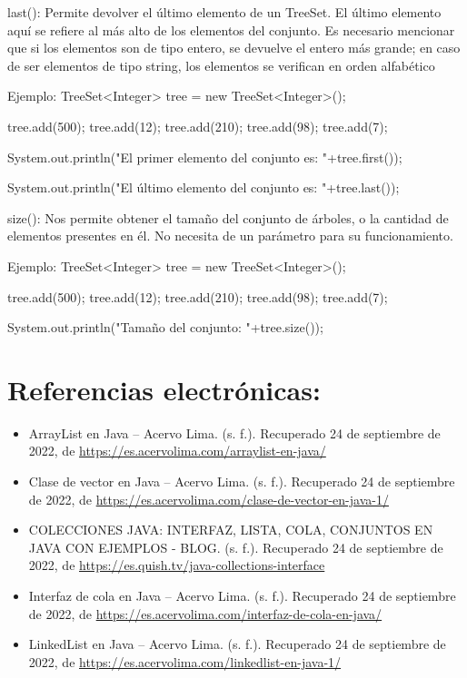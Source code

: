 \documentclass[12pt, letterpaper]{article} %
\begin{document}
last():
Permite devolver el último elemento de un TreeSet. El último elemento aquí se refiere al más alto de los elementos del conjunto. Es necesario mencionar que si los elementos son de tipo entero, se devuelve el entero más grande; en caso de ser elementos de tipo string, los elementos se verifican en orden alfabético

Ejemplo:
TreeSet<Integer> tree = new TreeSet<Integer>();

tree.add(500);
tree.add(12);
tree.add(210);
tree.add(98);
tree.add(7);

System.out.println("El primer elemento del conjunto es: "+tree.first());

System.out.println("El último elemento del conjunto es: "+tree.last());


size():
Nos permite obtener el tamaño del conjunto de árboles, o la cantidad de elementos presentes en él. No necesita de un parámetro para su funcionamiento.

Ejemplo:
TreeSet<Integer> tree = new TreeSet<Integer>();

tree.add(500);
tree.add(12);
tree.add(210);
tree.add(98);
tree.add(7);

System.out.println("Tamaño del conjunto: "+tree.size());


\section*{Referencias electrónicas:}
\begin{itemize}
    \item ArrayList en Java – Acervo Lima. (s. f.). Recuperado 24 de septiembre de 2022, de \href{https://bit.ly/3fB4HAN}{https://es.acervolima.com/arraylist-en-java/}
    
    \item Clase de vector en Java – Acervo Lima. (s. f.). Recuperado 24 de septiembre de 2022, de \href{https://es.acervolima.com/clase-de-vector-en-java-1/}{https://es.acervolima.com/clase-de-vector-en-java-1/}
    
    \item COLECCIONES JAVA: INTERFAZ, LISTA, COLA, CONJUNTOS EN JAVA CON EJEMPLOS - BLOG. (s. f.). Recuperado 24 de septiembre de 2022, de \href{https://es.quish.tv/java-collections-interface}{https://es.quish.tv/java-collections-interface}
    
    \item Interfaz de cola en Java – Acervo Lima. (s. f.). Recuperado 24 de septiembre de 2022, de \href{https://es.acervolima.com/interfaz-de-cola-en-java/}{https://es.acervolima.com/interfaz-de-cola-en-java/}
    
    \item LinkedList en Java – Acervo Lima. (s. f.). Recuperado 24 de septiembre de 2022, de \href{https://es.acervolima.com/linkedlist-en-java-1/}{https://es.acervolima.com/linkedlist-en-java-1/}
\end{itemize}
\end{document}
